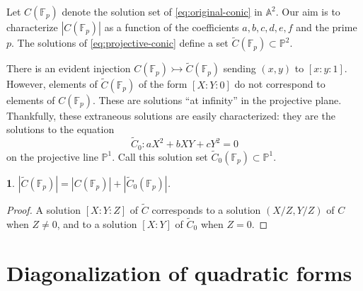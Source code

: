 \documentclass[10pt,a4paper]{amsart}
\numberwithin{equation}{section}
\numberwithin{figure}{section}
\theoremstyle{definition}
\theoremstyle{remark}
\theoremstyle{plain}
\theoremstyle{plain}
\theoremstyle{definition}
\theoremstyle{plain}
\theoremstyle{plain}
\newtheorem{lem}{\protect\lemmaname}[section]
\providecommand{\lemmaname}{Lemma}
\newcommand{\A}{\mathbb{A}}
\renewcommand{\P}{\mathbb{P}}
\newcommand{\F}{\mathbb{F}}
\begin{document}
    Let $C(\F_p)$ denote the solution set of \eqref{eq:original-conic} in $\A^2$. Our aim
    is to characterize $|C(\F_p)|$ as a function of the coefficients $a,b,c,d,e,f$ and 
    the prime $p$. The solutions of \eqref{eq:projective-conic} define a set
    $\widetilde{C}(\F_p) \subset \P^2$.

    There is an evident injection $C(\F_p) \rightarrowtail \widetilde{C}(\F_p)$ sending $(x,y)$ to
    $[x:y:1]$. However, elements of $\widetilde{C}(\F_p)$ of the form $[X:Y:0]$ do not 
    correspond to elements of $C(\F_p)$. 
    These are solutions ``at infinity'' in the projective plane.
    Thankfully, these extraneous solutions are easily characterized: they are the
    solutions to the equation
    \begin{equation}\label{eq:projective-conic-at-infinity} 
        \widetilde{C}_0 \colon aX^2 + bXY + cY^2 = 0
    \end{equation} 
    on the projective line $\P^1$. Call this solution set $\widetilde{C}_0(\F_p)\subset \P^1$.  

    \begin{lem}\label{lem:relate-solutions-affine-proj}
        $|\widetilde{C}(\F_p)| = |C(\F_p)| + |\widetilde{C}_0(\F_p)|$.
    \end{lem} 
    \begin{proof}
        A solution $[X:Y:Z]$ of $\widetilde{C}$ corresponds 
        to a solution $(X/Z,Y/Z)$ of $C$ when $Z \neq 0$,
        and to a solution $[X:Y]$ of $\widetilde{C}_0$ 
        when $Z = 0$.  
    \end{proof}

    \section{Diagonalization of quadratic forms}
    \label{sec:diagonalizing-quadratic-forms} 
\end{document}
